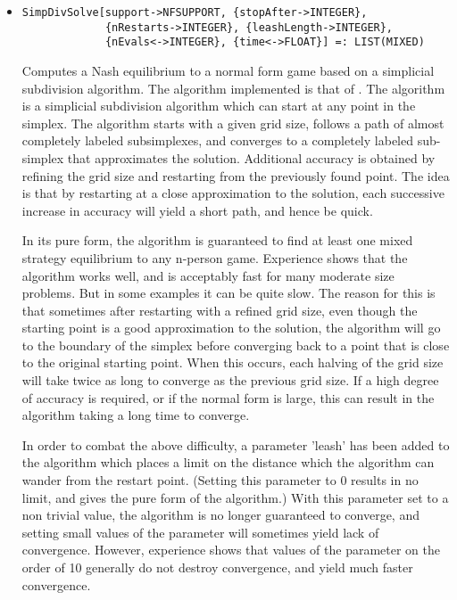 \begin{itemize}
\item
\protect \large \begin{verbatim}
SimpDivSolve[support->NFSUPPORT, {stopAfter->INTEGER}, 
             {nRestarts->INTEGER}, {leashLength->INTEGER},
             {nEvals<->INTEGER}, {time<->FLOAT}] =: LIST(MIXED)
\end{verbatim}\normalsize

\bd
Computes a Nash equilibrium to a normal form game based
on a simplicial subdivision algorithm.  The algorithm implemented is
that of \cite{VTH:1987}.  The 
algorithm is a simplicial subdivision algorithm which can start at any
point in the simplex.  The algorithm starts with a given grid size,
follows a path of almost completely labeled subsimplexes, and
converges to a completely labeled sub-simplex that approximates the
solution.  Additional accuracy is obtained by refining the grid size
and restarting from the previously found point.  The idea is that by
restarting at a close approximation to the solution, each successive
increase in accuracy will yield a short path, and hence be quick.

In its pure form, the algorithm is guaranteed to find at least one
mixed strategy equilibrium to any n-person game.  Experience shows
that the algorithm works well, and is acceptably fast for many
moderate size problems.  But in some examples it can be quite slow.
The reason for this is that sometimes after restarting with a refined
grid size, even though the starting point is a good approximation to
the solution, the algorithm will go to the boundary of the simplex
before converging back to a point that is close to the original
starting point.  When this occurs, each halving of the grid size will
take twice as long to converge as the previous grid size.  If a high
degree of accuracy is required, or if the normal form is large, this
can result in the algorithm taking a long time to converge.

In order to combat the above difficulty, a parameter 'leash' has been
added to the algorithm which places a limit on the distance which the
algorithm can wander from the restart point. (Setting this parameter
to 0 results in no limit, and gives the pure form of the algorithm.)
With this parameter set to a non trivial value, the algorithm is no
longer guaranteed to converge, and setting small values of the
parameter will sometimes yield lack of convergence.  However,
experience shows that values of the parameter on the order of 10
generally do not destroy convergence, and yield much faster
convergence.


\end{itemize}
